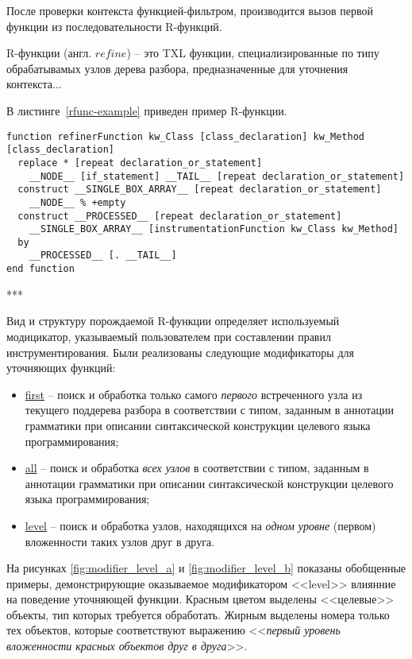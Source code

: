 После проверки контекста функцией-фильтром, производится вызов первой функции из последовательности R-функций.

R-функции (англ. $refine$) -- это TXL функции, специализированные по типу обрабатывамых узлов дерева разбора, предназначенные для уточнения контекста...

В листинге~\ref{rfunc-example} приведен пример R-функции.

\begin{lstlisting}[frame=single, language=TXL, label={rfunc-example}, caption={Пример R-функции}]
function refinerFunction kw_Class [class_declaration] kw_Method [class_declaration]
  replace * [repeat declaration_or_statement]
    __NODE__ [if_statement] __TAIL__ [repeat declaration_or_statement]
  construct __SINGLE_BOX_ARRAY__ [repeat declaration_or_statement]
    __NODE__ % +empty
  construct __PROCESSED__ [repeat declaration_or_statement]
    __SINGLE_BOX_ARRAY__ [instrumentationFunction kw_Class kw_Method]
  by
    __PROCESSED__ [. __TAIL__]
end function
\end{lstlisting}

***

Вид и структуру порождаемой R-функции определяет используемый модицикатор, указываемый пользователем при составлении правил инструментирования.
Были реализованы следующие модификаторы для уточняющих функций:

\begin{itemize}[noitemsep]
  \item \underline{first} -- поиск и обработка только самого \textit{первого} встреченного узла из текущего поддерева разбора в соответствии с типом, заданным в аннотации грамматики при описании синтаксической конструкции целевого языка программирования;
  \item \underline{all}   -- поиск и обработка \textit{всех узлов} в соответствии с типом, заданным в аннотации грамматики при описании синтаксической конструкции целевого языка программирования;
  \item \underline{level} -- поиск и обработка узлов, находящихся на \textit{одном уровне} (первом) вложенности таких узлов друг в друга.
\end{itemize}

На рисунках \ref{fig:modifier_level_a} и \ref{fig:modifier_level_b} показаны обобщенные примеры, демонстрирующие оказываемое модификатором <<level>> влиянние на поведение уточняющей функции.
Красным цветом выделены <<целевые>> объекты, тип которых требуется обработать.
Жирным выделены номера только тех объектов, которые соответствуют выражению <<\textit{первый уровень вложенности красных объектов друг в друга}>>.

